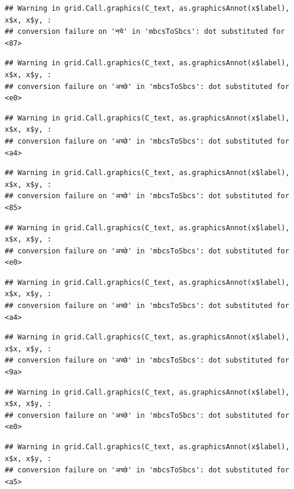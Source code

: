 \documentclass[
]{article}
\begin{document}
\begin{verbatim}
## Warning in grid.Call.graphics(C_text, as.graphicsAnnot(x$label), x$x, x$y, :
## conversion failure on 'नये' in 'mbcsToSbcs': dot substituted for <87>
\end{verbatim}

\begin{verbatim}
## Warning in grid.Call.graphics(C_text, as.graphicsAnnot(x$label), x$x, x$y, :
## conversion failure on 'अच्छे' in 'mbcsToSbcs': dot substituted for <e0>
\end{verbatim}

\begin{verbatim}
## Warning in grid.Call.graphics(C_text, as.graphicsAnnot(x$label), x$x, x$y, :
## conversion failure on 'अच्छे' in 'mbcsToSbcs': dot substituted for <a4>
\end{verbatim}

\begin{verbatim}
## Warning in grid.Call.graphics(C_text, as.graphicsAnnot(x$label), x$x, x$y, :
## conversion failure on 'अच्छे' in 'mbcsToSbcs': dot substituted for <85>
\end{verbatim}

\begin{verbatim}
## Warning in grid.Call.graphics(C_text, as.graphicsAnnot(x$label), x$x, x$y, :
## conversion failure on 'अच्छे' in 'mbcsToSbcs': dot substituted for <e0>
\end{verbatim}

\begin{verbatim}
## Warning in grid.Call.graphics(C_text, as.graphicsAnnot(x$label), x$x, x$y, :
## conversion failure on 'अच्छे' in 'mbcsToSbcs': dot substituted for <a4>
\end{verbatim}

\begin{verbatim}
## Warning in grid.Call.graphics(C_text, as.graphicsAnnot(x$label), x$x, x$y, :
## conversion failure on 'अच्छे' in 'mbcsToSbcs': dot substituted for <9a>
\end{verbatim}

\begin{verbatim}
## Warning in grid.Call.graphics(C_text, as.graphicsAnnot(x$label), x$x, x$y, :
## conversion failure on 'अच्छे' in 'mbcsToSbcs': dot substituted for <e0>
\end{verbatim}

\begin{verbatim}
## Warning in grid.Call.graphics(C_text, as.graphicsAnnot(x$label), x$x, x$y, :
## conversion failure on 'अच्छे' in 'mbcsToSbcs': dot substituted for <a5>
\end{verbatim}
\end{document}
